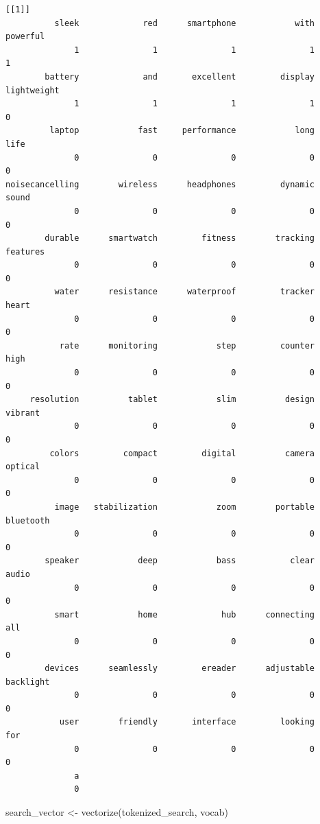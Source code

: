 \documentclass[
  letterpaper,
  DIV=11,
  numbers=noendperiod]{scrartcl}
\newenvironment{Shaded}{\begin{snugshade}}{\end{snugshade}}
\newcommand{\FunctionTok}[1]{\textcolor[rgb]{0.28,0.35,0.67}{#1}}
\newcommand{\NormalTok}[1]{\textcolor[rgb]{0.00,0.23,0.31}{#1}}
\newcommand{\OtherTok}[1]{\textcolor[rgb]{0.00,0.23,0.31}{#1}}
\begin{document}
\begin{verbatim}
[[1]]
          sleek             red      smartphone            with        powerful 
              1               1               1               1               1 
        battery             and       excellent         display     lightweight 
              1               1               1               1               0 
         laptop            fast     performance            long            life 
              0               0               0               0               0 
noisecancelling        wireless      headphones         dynamic           sound 
              0               0               0               0               0 
        durable      smartwatch         fitness        tracking        features 
              0               0               0               0               0 
          water      resistance      waterproof         tracker           heart 
              0               0               0               0               0 
           rate      monitoring            step         counter            high 
              0               0               0               0               0 
     resolution          tablet            slim          design         vibrant 
              0               0               0               0               0 
         colors         compact         digital          camera         optical 
              0               0               0               0               0 
          image   stabilization            zoom        portable       bluetooth 
              0               0               0               0               0 
        speaker            deep            bass           clear           audio 
              0               0               0               0               0 
          smart            home             hub      connecting             all 
              0               0               0               0               0 
        devices      seamlessly         ereader      adjustable       backlight 
              0               0               0               0               0 
           user        friendly       interface         looking             for 
              0               0               0               0               0 
              a 
              0 
\end{verbatim}

\begin{Shaded}
\begin{Highlighting}[]
\NormalTok{search\_vector }\OtherTok{\textless{}{-}} \FunctionTok{vectorize}\NormalTok{(tokenized\_search, vocab)}
\end{Highlighting}
\end{Shaded}
\end{document}
